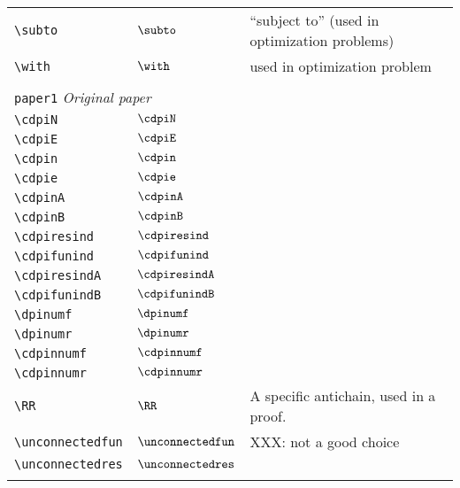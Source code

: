 \begin{longtable}{lll}
 {\color[rgb]{0.5,0.5,0.5}\texttt{\textbackslash subto}} & $\subto$ &  ``subject to'' (used in optimization problems)\\ 
 {\color[rgb]{0.5,0.5,0.5}\texttt{\textbackslash with}} & $\with$ &  used in optimization problem\\ 
  &  & \\ 
 \multicolumn{3}{l}{{\color[rgb]{0.5,0.5,0.5}\texttt{paper1}} \emph{Original paper}}\\ 
 \hline
\hline
{\color[rgb]{0.5,0.5,0.5}\texttt{\textbackslash cdpiN}} & $\cdpiN$ & \\ 
 {\color[rgb]{0.5,0.5,0.5}\texttt{\textbackslash cdpiE}} & $\cdpiE$ & \\ 
 {\color[rgb]{0.5,0.5,0.5}\texttt{\textbackslash cdpin}} & $\cdpin$ & \\ 
 {\color[rgb]{0.5,0.5,0.5}\texttt{\textbackslash cdpie}} & $\cdpie$ & \\ 
 {\color[rgb]{0.5,0.5,0.5}\texttt{\textbackslash cdpinA}} & $\cdpinA$ & \\ 
 {\color[rgb]{0.5,0.5,0.5}\texttt{\textbackslash cdpinB}} & $\cdpinB$ & \\ 
 {\color[rgb]{0.5,0.5,0.5}\texttt{\textbackslash cdpiresind}} & $\cdpiresind$ & \\ 
 {\color[rgb]{0.5,0.5,0.5}\texttt{\textbackslash cdpifunind}} & $\cdpifunind$ & \\ 
 {\color[rgb]{0.5,0.5,0.5}\texttt{\textbackslash cdpiresindA}} & $\cdpiresindA$ & \\ 
 {\color[rgb]{0.5,0.5,0.5}\texttt{\textbackslash cdpifunindB}} & $\cdpifunindB$ & \\ 
 {\color[rgb]{0.5,0.5,0.5}\texttt{\textbackslash dpinumf}} & $\dpinumf$ & \\ 
 {\color[rgb]{0.5,0.5,0.5}\texttt{\textbackslash dpinumr}} & $\dpinumr$ & \\ 
 {\color[rgb]{0.5,0.5,0.5}\texttt{\textbackslash cdpinnumf}} & $\cdpinnumf$ & \\ 
 {\color[rgb]{0.5,0.5,0.5}\texttt{\textbackslash cdpinnumr}} & $\cdpinnumr$ & \\ 
 {\color[rgb]{0.5,0.5,0.5}\texttt{\textbackslash RR}} & $\RR$ &  A specific antichain, used in a proof.\\ 
 {\color[rgb]{0.5,0.5,0.5}\texttt{\textbackslash unconnectedfun}} & $\unconnectedfun$ &  XXX: not a good choice\\ 
 {\color[rgb]{0.5,0.5,0.5}\texttt{\textbackslash unconnectedres}} & $\unconnectedres$ & \\ 
  &  & \\ 

\end{longtable}
